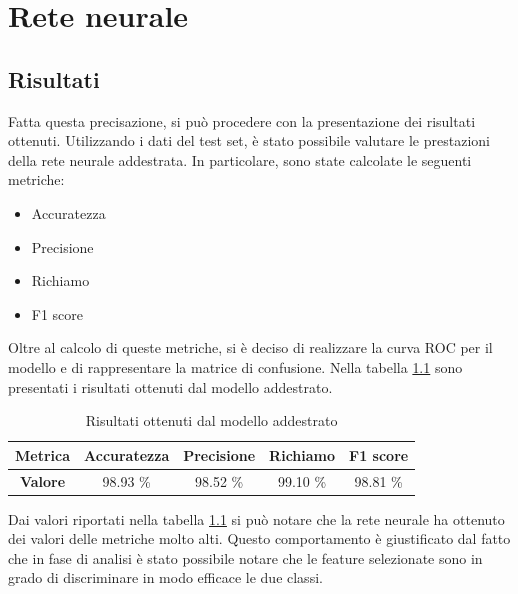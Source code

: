 \chapter{Rete neurale} \label{chp:reteNeurale}
\section{Risultati}


Fatta questa precisazione, si può procedere con la presentazione dei risultati
ottenuti. Utilizzando i dati del test set, è stato possibile valutare le
prestazioni della rete neurale addestrata. In particolare, sono state calcolate
le seguenti metriche:
\begin{itemize}
    \item Accuratezza
    \item Precisione
    \item Richiamo
    \item F1 score
\end{itemize}
Oltre al calcolo di queste metriche, si è deciso di realizzare la curva ROC per
il modello e di rappresentare la matrice di confusione. Nella tabella
\ref{tab:risultatiReteNeurale} sono presentati i risultati ottenuti dal modello
addestrato.
\begin{table}[!ht]
    \centering
    \begin{tabular}{@{}cllll@{}}
        \toprule
        \rowcolor[HTML]{EFEFEF}
        \textbf{Metrica}                        & \textbf{Accuratezza}         & \textbf{Precisione}          & \textbf{Richiamo}            & \textbf{F1 score}            \\ \midrule
        \cellcolor[HTML]{EFEFEF}\textbf{Valore} & \multicolumn{1}{c}{98.93 \%} & \multicolumn{1}{c}{98.52 \%} & \multicolumn{1}{c}{99.10 \%} & \multicolumn{1}{c}{98.81 \%} \\ \bottomrule
    \end{tabular}
    \caption{Risultati ottenuti dal modello addestrato}
    \label{tab:risultatiReteNeurale}
\end{table}

Dai valori riportati nella tabella \ref{tab:risultatiReteNeurale} si può notare
che la rete neurale ha ottenuto dei valori delle metriche molto alti. Questo
comportamento è giustificato dal fatto che in fase di analisi è stato possibile
notare che le feature selezionate sono in grado di discriminare in modo efficace
le due classi.

